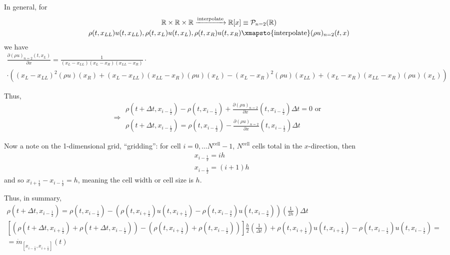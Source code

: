 \documentclass[10pt]{amsart}
\begin{document}
\begin{multicols*}{2}
In general, for
\[
\begin{gathered}
  \mathbb{R} \times \mathbb{R}\times\mathbb{R} \xrightarrow{ \text{interpolate} } \mathbb{R}[x] \equiv \mathcal{P}_{n=2}(\mathbb{R}) \\ 
 \rho(t,x_{LL } ) u(t,x_{LL }) , \rho(t,x_{L })u(t,x_{L } ), \rho(t,x_{R })u(t,x_{R } ) \xmapsto{ \text{interpolate} } (\rho u)_{n=2}(t,x)
  \end{gathered}
\]
we have
\[
\begin{gathered}
  \frac{ \partial (\rho u)_{n=2}(t,x_{L } ) }{ \partial x} = 
  \frac{1}{\left(x_{L} - x_{LL}\right) \left(x_{L} - x_{R}\right) \left(x_{LL} - x_{R}\right)} \cdot \\
  \cdot \left(\left(x_{L} - x_{LL}\right)^{2} (\rho u){\left (x_{R} \right )} + \left(x_{L} - x_{LL}\right) \left(x_{LL} - x_{R}\right) (\rho u){\left (x_{L} \right )} - \left(x_{L} - x_{R}\right)^{2} (\rho u){\left (x_{LL} \right )} + \left(x_{L} - x_{R}\right) \left(x_{LL} - x_{R}\right) (\rho u){\left (x_{L} \right )}\right)
\end{gathered}
\]

Thus,
\begin{equation}
\Longrightarrow \begin{gathered}
  \rho(t+\Delta t, x_{i-\frac{1}{2} } ) - \rho(t,x_{i-\frac{1}{2} } ) + \frac{ \partial (\rho u)_{n=2} }{\partial x}(t,x_{i-\frac{1}{2} } )\Delta t = 0  \text{ or } \\
  \rho(t+\Delta t,x_{i-\frac{1}{2} } ) = \rho(t,x_{i-\frac{1}{2} } ) - \frac{ \partial (\rho u)_{n=2} }{ \partial x}(t,x_{i-\frac{1}{2} })\Delta t
  \end{gathered}
\end{equation}

Now a note on the 1-dimensional grid, ``gridding'': for cell $i=0, \dots N^{\text{cell}} -1$, $N^{\text{cell}}$ cells total in the $x$-direction, then
\[
\begin{aligned}
  & x_{i-\frac{1}{2} } = ih \\ 
  & x_{i-\frac{1}{2} } = (i+1)h 
  \end{aligned}
\]
and so $x_{i+\frac{1}{2} } - x_{i-\frac{1}{2} } = h$, meaning the cell width or cell size is $h$.

Thus, in summary, 
\begin{equation}
\begin{gathered}
  \rho(t+\Delta t,x_{i-\frac{1}{2} }) = \rho(t,x_{i-\frac{1}{2} }) - ( \rho(t,x_{i+\frac{1}{2} })u(t,x_{i+\frac{1}{2} } ) - \rho(t,x_{i-\frac{3}{2} })u(t,x_{i-\frac{3}{2} } ) )\left( \frac{1}{2h} \right) \Delta t \\
  \left[ (\rho(t+\Delta t, x_{i+\frac{1}{2} } ) + \rho(t+\Delta t, x_{i-\frac{1}{2} } ) ) - (\rho(t, x_{i+\frac{1}{2} } ) + \rho(t, x_{i-\frac{1}{2} } ) ) \right] \frac{h}{2} \left( \frac{1}{\Delta t} \right) + \rho(t,x_{i+\frac{1}{2} } )u(t,x_{i+\frac{1}{2} } ) - \rho(t,x_{i-\frac{1}{2} } )u(t,x_{i-\frac{1}{2} } ) = \\
    = \dot{m}_{[x_{i-\frac{1}{2} }, x_{i+\frac{1}{2} }] }(t)
  \end{gathered}
  \end{equation}


\end{multicols*}
\end{document}
